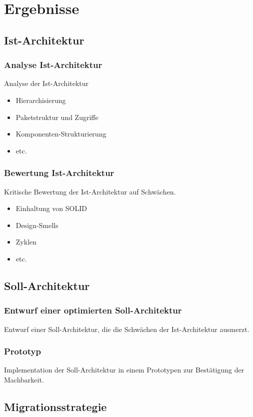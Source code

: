 \chapter{Ergebnisse}

\section{Ist-Architektur}
\subsection{Analyse Ist-Architektur}
Analyse der Ist-Architektur
\begin{itemize}
\item Hi­e­r­ar­chi­sie­rung
\item Paketstruktur und Zugriffe
\item Komponenten-Strukturierung
\item etc.
\end{itemize}

\subsection{Bewertung Ist-Architektur}
Kritische Bewertung der Ist-Architektur auf Schwächen.
\begin{itemize}
\item Einhaltung von SOLID
\item Design-Smells
\item Zyklen
\item etc.
\end{itemize}
\section{Soll-Architektur}
\subsection{Entwurf einer optimierten Soll-Architektur}
Entwurf einer Soll-Architektur, die die Schwächen der Ist-Architektur ausmerzt.

\subsection{Prototyp}
Implementation der Soll-Architektur in einem Prototypen zur Bestätigung der Machbarkeit.

\section{Migrationsstrategie}
